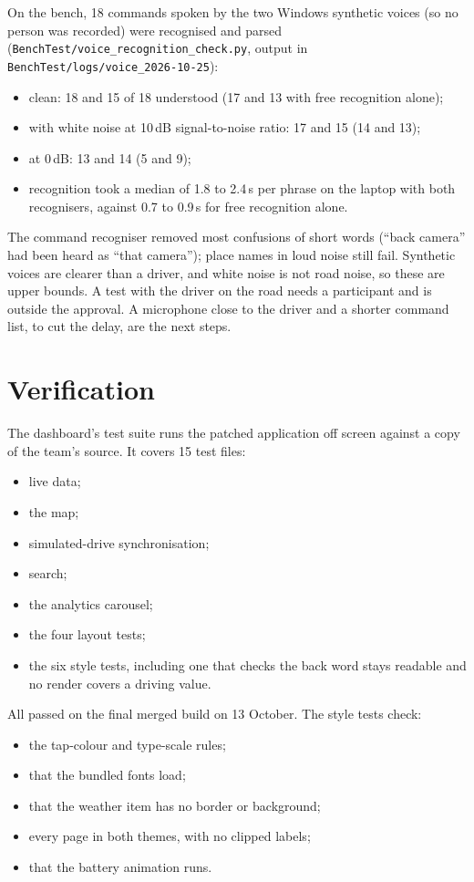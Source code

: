 On the bench, 18 commands spoken by the two Windows synthetic voices (so no person was recorded) were recognised and parsed (\texttt{BenchTest/\allowbreak{}voice\_recognition\_check.py}, output in \texttt{BenchTest/\allowbreak{}logs/\allowbreak{}voice\_2026-10-25}):
\begin{itemize}
\item clean: 18 and 15 of 18 understood (17 and 13 with free recognition alone);
\item with white noise at 10\,dB signal-to-noise ratio: 17 and 15 (14 and 13);
\item at 0\,dB: 13 and 14 (5 and 9);
\item recognition took a median of 1.8 to 2.4\,s per phrase on the laptop with both recognisers, against 0.7 to 0.9\,s for free recognition alone.
\end{itemize}
The command recogniser removed most confusions of short words (``back camera'' had been heard as ``that camera''); place names in loud noise still fail. Synthetic voices are clearer than a driver, and white noise is not road noise, so these are upper bounds. A test with the driver on the road needs a participant and is outside the approval. A microphone close to the driver and a shorter command list, to cut the delay, are the next steps.

\section{Verification}

The dashboard's test suite runs the patched application off screen against a copy of the team's source. It covers 15 test files:
\begin{itemize}
\item live data;
\item the map;
\item simulated-drive synchronisation;
\item search;
\item the analytics carousel;
\item the four layout tests;
\item the six style tests, including one that checks the back word stays readable and no render covers a driving value.
\end{itemize}

All passed on the final merged build on 13 October. The style tests check:
\begin{itemize}
\item the tap-colour and type-scale rules;
\item that the bundled fonts load;
\item that the weather item has no border or background;
\item every page in both themes, with no clipped labels;
\item that the battery animation runs.
\end{itemize}

